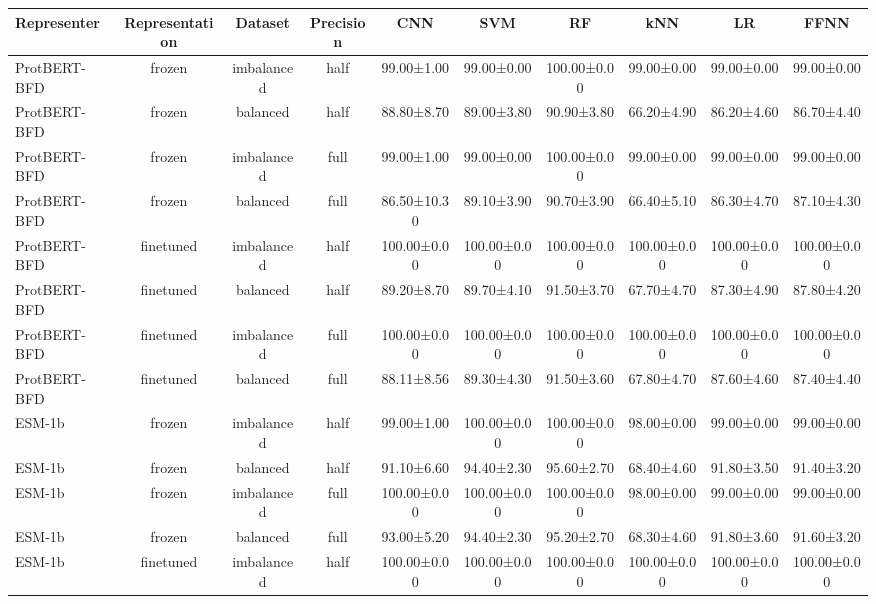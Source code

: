 \begin{tabular}{lccccccccc}
\toprule
 \textbf{Representer} & \textbf{Representation} &    \textbf{Dataset} & \textbf{Precision} &         \textbf{CNN} &         \textbf{SVM} &          \textbf{RF} &         \textbf{kNN} &          \textbf{LR} &        \textbf{FFNN} \\
\midrule
ProtBERT-BFD &         frozen & imbalanced &      half &  99.00±1.00 &  99.00±0.00 & 100.00±0.00 &  99.00±0.00 &  99.00±0.00 &  99.00±0.00 \\
ProtBERT-BFD &         frozen &   balanced &      half &  88.80±8.70 &  89.00±3.80 &  90.90±3.80 &  66.20±4.90 &  86.20±4.60 &  86.70±4.40 \\
ProtBERT-BFD &         frozen & imbalanced &      full &  99.00±1.00 &  99.00±0.00 & 100.00±0.00 &  99.00±0.00 &  99.00±0.00 &  99.00±0.00 \\
ProtBERT-BFD &         frozen &   balanced &      full & 86.50±10.30 &  89.10±3.90 &  90.70±3.90 &  66.40±5.10 &  86.30±4.70 &  87.10±4.30 \\
ProtBERT-BFD &      finetuned & imbalanced &      half & 100.00±0.00 & 100.00±0.00 & 100.00±0.00 & 100.00±0.00 & 100.00±0.00 & 100.00±0.00 \\
ProtBERT-BFD &      finetuned &   balanced &      half &  89.20±8.70 &  89.70±4.10 &  91.50±3.70 &  67.70±4.70 &  87.30±4.90 &  87.80±4.20 \\
ProtBERT-BFD &      finetuned & imbalanced &      full & 100.00±0.00 & 100.00±0.00 & 100.00±0.00 & 100.00±0.00 & 100.00±0.00 & 100.00±0.00 \\
ProtBERT-BFD &      finetuned &   balanced &      full &  88.11±8.56 &  89.30±4.30 &  91.50±3.60 &  67.80±4.70 &  87.60±4.60 &  87.40±4.40 \\
      ESM-1b &         frozen & imbalanced &      half &  99.00±1.00 & 100.00±0.00 & 100.00±0.00 &  98.00±0.00 &  99.00±0.00 &  99.00±0.00 \\
      ESM-1b &         frozen &   balanced &      half &  91.10±6.60 &  94.40±2.30 &  95.60±2.70 &  68.40±4.60 &  91.80±3.50 &  91.40±3.20 \\
      ESM-1b &         frozen & imbalanced &      full & 100.00±0.00 & 100.00±0.00 & 100.00±0.00 &  98.00±0.00 &  99.00±0.00 &  99.00±0.00 \\
      ESM-1b &         frozen &   balanced &      full &  93.00±5.20 &  94.40±2.30 &  95.20±2.70 &  68.30±4.60 &  91.80±3.60 &  91.60±3.20 \\
      ESM-1b &      finetuned & imbalanced &      half & 100.00±0.00 & 100.00±0.00 & 100.00±0.00 & 100.00±0.00 & 100.00±0.00 & 100.00±0.00 \\

\end{tabular}
